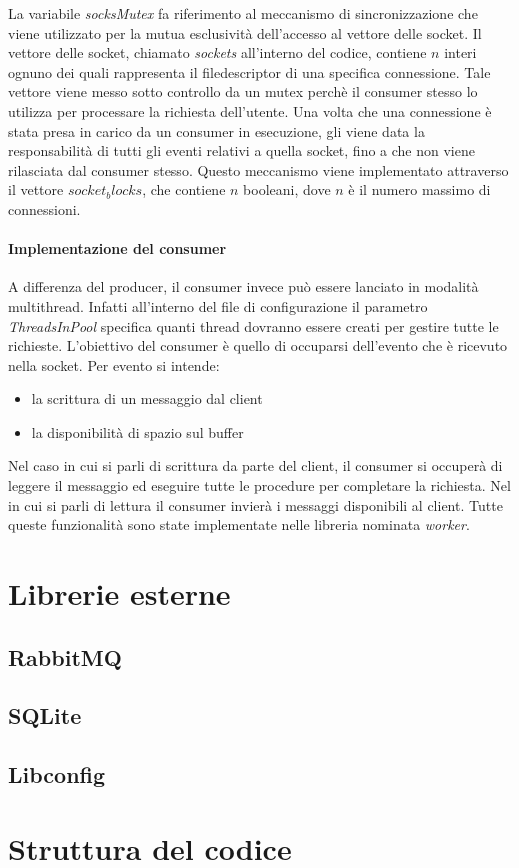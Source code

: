 \documentclass[]{article}
\begin{document}
La variabile \textit{socksMutex} fa riferimento al meccanismo di sincronizzazione
che viene utilizzato per la mutua esclusivit\`a dell'accesso al vettore delle socket.
Il vettore delle socket, chiamato \textit{sockets} all'interno del codice, contiene
$n$ interi ognuno dei quali rappresenta il filedescriptor di una specifica connessione.
Tale vettore viene messo sotto controllo da un mutex perch\`e il consumer stesso lo utilizza
per processare la richiesta dell'utente.
Una volta che una connessione \`e stata presa in carico da un consumer in esecuzione,
gli viene data la responsabilit\`a di tutti gli eventi relativi a quella socket, fino a
che non viene rilasciata dal consumer stesso.
Questo meccanismo viene implementato attraverso il vettore $socket_blocks$, che contiene
$n$ booleani, dove $n$ \`e il numero massimo di connessioni.


\paragraph{Implementazione del consumer}
A differenza del producer, il consumer invece pu\`o essere lanciato in modalit\`a multithread.
Infatti all'interno del file di configurazione il parametro \textit{ThreadsInPool} specifica
quanti thread dovranno essere creati per gestire tutte le richieste.
L'obiettivo del consumer \`e quello di occuparsi dell'evento che \`e ricevuto nella socket.
Per evento si intende:
\begin{itemize}
	\item la scrittura di un messaggio dal client
	\item la disponibilit\`a di spazio sul buffer
\end{itemize}
Nel caso in cui si parli di scrittura da parte del client, il consumer si occuper\`a di leggere
il messaggio ed eseguire tutte le procedure per completare la richiesta.
Nel in cui si parli di lettura il consumer invierà i messaggi disponibili al client.
Tutte queste funzionalit\`a sono state implementate nelle libreria nominata \textit{worker}.

\section{Librerie esterne}
\subsection{RabbitMQ}
\subsection{SQLite}
\subsection{Libconfig}

\section{Struttura del codice}
\end{document}
